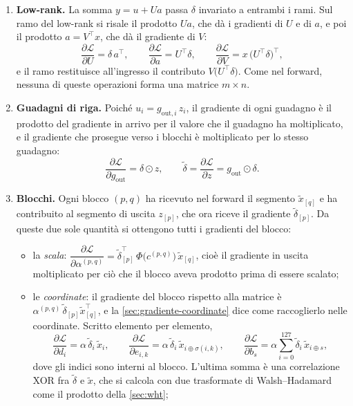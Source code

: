 \begin{enumerate}
\item[\textbf{B1.}] \textbf{Low-rank.} La somma $y=u+Ua$ passa $\delta$ invariato a entrambi i rami. Sul ramo del low-rank si risale il prodotto $Ua$, che dà i gradienti di $U$ e di $a$, e poi il prodotto $a=V^\top x$, che dà il gradiente di $V$:
\[
\frac{\partial\mathcal L}{\partial U}=\delta\,a^\top,\qquad
\frac{\partial\mathcal L}{\partial a}=U^\top\delta,\qquad
\frac{\partial\mathcal L}{\partial V}=x\,\big(U^\top\delta\big)^\top,
\]
e il ramo restituisce all'ingresso il contributo $V\big(U^\top\delta\big)$. Come nel forward, nessuna di queste operazioni forma una matrice $m\times n$.
\item[\textbf{B2.}] \textbf{Guadagni di riga.} Poiché $u_i=g_{\mathrm{out},i}\,z_i$, il gradiente di ogni guadagno è il prodotto del gradiente in arrivo per il valore che il guadagno ha moltiplicato, e il gradiente che prosegue verso i blocchi è moltiplicato per lo stesso guadagno:
\[
\frac{\partial\mathcal L}{\partial g_{\mathrm{out}}}=\delta\odot z,\qquad
\tilde\delta=\frac{\partial\mathcal L}{\partial z}=g_{\mathrm{out}}\odot\delta .
\]
\item[\textbf{B3.}] \textbf{Blocchi.} Ogni blocco $(p,q)$ ha ricevuto nel forward il segmento $\tilde x_{[q]}$ e ha contribuito al segmento di uscita $z_{[p]}$, che ora riceve il gradiente $\tilde\delta_{[p]}$. Da queste due sole quantità si ottengono tutti i gradienti del blocco:
\begin{itemize}
\item la \emph{scala}: $\dfrac{\partial\mathcal L}{\partial\alpha^{(p,q)}}=\tilde\delta_{[p]}^{\top}\,\Phi\big(c^{(p,q)}\big)\,\tilde x_{[q]}$, cioè il gradiente in uscita moltiplicato per ciò che il blocco aveva prodotto prima di essere scalato;
\item le \emph{coordinate}: il gradiente del blocco rispetto alla matrice è $\alpha^{(p,q)}\,\tilde\delta_{[p]}\tilde x_{[q]}^{\top}$, e la \autoref{sec:gradiente-coordinate} dice come raccoglierlo nelle coordinate. Scritto elemento per elemento,
\[
\frac{\partial\mathcal L}{\partial d_i}=\alpha\,\tilde\delta_i\,\tilde x_i,\qquad
\frac{\partial\mathcal L}{\partial e_{i,k}}=\alpha\,\tilde\delta_i\,\tilde x_{i\oplus\sigma(i,k)},\qquad
\frac{\partial\mathcal L}{\partial b_s}=\alpha\sum_{i=0}^{127}\tilde\delta_i\,\tilde x_{i\oplus s},
\]
dove gli indici sono interni al blocco. L'ultima somma è una correlazione XOR fra $\tilde\delta$ e $\tilde x$, che si calcola con due trasformate di Walsh--Hadamard come il prodotto della \autoref{sec:wht};

\end{itemize}
\end{enumerate}

